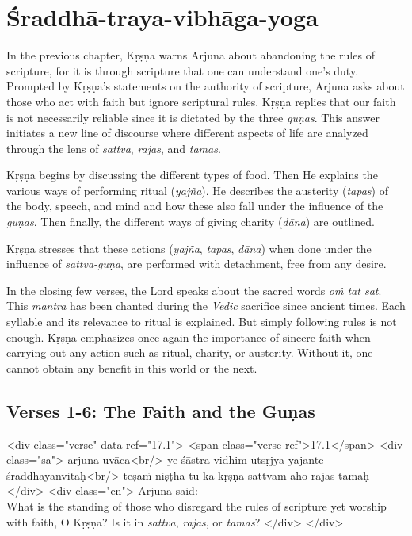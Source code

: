 \chapter{Śraddhā-traya-vibhāga-yoga}\label{chap-sraddha-traya-vibhaga-yoga}

\noindent In the previous chapter, Kṛṣṇa warns Arjuna about abandoning the rules of scripture, for it is through scripture that one can understand one’s duty. Prompted by Kṛṣṇa's statements on the authority of scripture, Arjuna asks about those who act with faith but ignore scriptural rules. Kṛṣṇa replies that our faith is not necessarily reliable since it is dictated by the three \textit{guṇas}. This answer initiates a new line of discourse where different aspects of life are analyzed through the lens of \textit{sattva}, \textit{rajas}, and \textit{tamas}.

Kṛṣṇa begins by discussing the different types of food. Then He explains the various ways of performing ritual (\textit{yajña}). He describes the austerity (\textit{tapas}) of the body, speech, and mind and how these also fall under the influence of the \textit{guṇas}. Then finally, the different ways of giving charity (\textit{dāna}) are outlined.

Kṛṣṇa stresses that these actions (\textit{yajña}, \textit{tapas}, \textit{dāna}) when done under the influence of \textit{sattva-guṇa}, are performed with detachment, free from any desire.

In the closing few verses, the Lord speaks about the sacred words \textit{oṁ tat sat}. This \textit{mantra} has been chanted during the \textit{Vedic} sacrifice since ancient times. Each syllable and its relevance to ritual is explained. But simply following rules is not enough. Kṛṣṇa emphasizes once again the importance of sincere faith when carrying out any action such as ritual, charity, or austerity. Without it, one cannot obtain any benefit in this world or the next.

\section{Verses 1-6: The Faith and the Guṇas}\label{sec-verses-1-6-the-faith-and-the-gunas}


\begin{html}
<div class="verse" data-ref="17.1">
  <span class="verse-ref">17.1</span>
  <div class="sa">
    arjuna uvāca<br/>
    ye śāstra-vidhim utsṛjya yajante śraddhayānvitāḥ<br/>
    teṣāṁ niṣṭhā tu kā kṛṣṇa sattvam āho rajas tamaḥ
  </div>
  <div class="en">
    \hspace*{1em}Arjuna said: \\ What is the standing of those who disregard the rules of scripture yet worship with faith, O Kṛṣṇa? Is it in \textit{sattva}, \textit{rajas}, or \textit{tamas}?
  </div>
</div>
\end{html}



